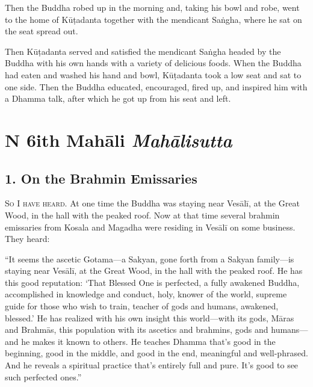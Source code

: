\documentclass[12pt,openany]{book}%
\newcommand*{\suttatitleacronym}[1]{\smaller[2]{#1}\vspace*{.3em}}
\newcommand*{\suttatitletranslation}[1]{\linebreak{#1}}
\newcommand*{\suttatitleroot}[1]{\linebreak\smaller[2]\itshape{#1}}
\newcommand*{\tocacronym}[1]{\hspace*{-3.3em}{#1}\quad}
\newcommand*{\toctranslation}[1]{#1}
\newcommand*{\tocroot}[1]{(\textit{#1})}
\newcommand*{\scevam}[1]{\textsc{#1}}
\begin{document}
Then the Buddha robed up in the morning and, taking his bowl and robe, went to the home of \textsanskrit{Kūṭadanta} together with the mendicant \textsanskrit{Saṅgha}, where he sat on the seat spread out. 

Then \textsanskrit{Kūṭadanta} served and satisfied the mendicant \textsanskrit{Saṅgha} headed by the Buddha with his own hands with a variety of delicious foods. When the Buddha had eaten and washed his hand and bowl, \textsanskrit{Kūṭadanta} took a low seat and sat to one side. Then the Buddha educated, encouraged, fired up, and inspired him with a Dhamma talk, after which he got up from his seat and left. 

%
\chapter*{{\suttatitleacronym DN 6}{\suttatitletranslation With Mahāli }{\suttatitleroot Mahālisutta}}
\addcontentsline{toc}{chapter}{\tocacronym{DN 6} \toctranslation{With Mahāli } \tocroot{Mahālisutta}}

\section*{1. On the Brahmin Emissaries }

\scevam{So I have heard. }At one time the Buddha was staying near \textsanskrit{Vesālī}, at the Great Wood, in the hall with the peaked roof. Now at that time several brahmin emissaries from Kosala and Magadha were residing in \textsanskrit{Vesālī} on some business. They heard: 

“It seems the ascetic Gotama—a Sakyan, gone forth from a Sakyan family—is staying near \textsanskrit{Vesālī}, at the Great Wood, in the hall with the peaked roof. He has this good reputation: ‘That Blessed One is perfected, a fully awakened Buddha, accomplished in knowledge and conduct, holy, knower of the world, supreme guide for those who wish to train, teacher of gods and humans, awakened, blessed.’ He has realized with his own insight this world—with its gods, \textsanskrit{Māras} and \textsanskrit{Brahmās}, this population with its ascetics and brahmins, gods and humans—and he makes it known to others. He teaches Dhamma that’s good in the beginning, good in the middle, and good in the end, meaningful and well-phrased. And he reveals a spiritual practice that’s entirely full and pure. It’s good to see such perfected ones.” 
\end{document}
